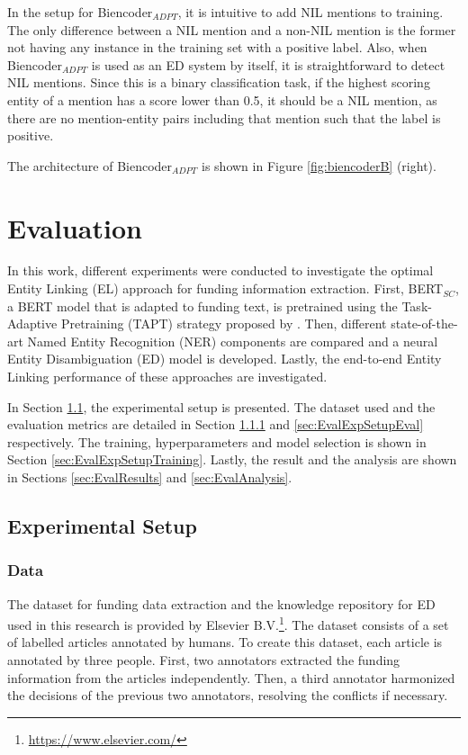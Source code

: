 \documentclass{report}
\theoremstyle{definition}
\theoremstyle{remark}
\begin{document}
In the setup for Biencoder$_{ADPT}$, it is intuitive to add NIL mentions to training. The only difference between a NIL mention and a non-NIL mention is the former not having any instance in the training set with a positive label. Also, when Biencoder$_{ADPT}$ is used as an ED system by itself, it is straightforward to detect NIL mentions. Since this is a binary classification task, if the highest scoring entity of a mention has a score lower than 0.5, it should be a NIL mention, as there are no mention-entity pairs including that mention such that the label is positive. 

The architecture of Biencoder$_{ADPT}$ is shown in Figure \ref{fig:biencoderB} (right).

\newpage
\chapter{Evaluation}
\label{sec:Evaluation}
In this work, different experiments were conducted to investigate the optimal Entity Linking (EL) approach for funding information extraction. First, BERT$_{SC}$, a BERT model that is adapted to funding text, is pretrained using the Task-Adaptive Pretraining (TAPT) strategy proposed by \cite{DontStop}. Then, different state-of-the-art Named Entity Recognition (NER) components are compared and a neural Entity Disambiguation (ED) model is developed. Lastly, the end-to-end Entity Linking performance of these approaches are investigated.

In Section \ref{sec:EvalExpSetup}, the experimental setup is presented. The dataset used and the evaluation metrics are detailed in Section \ref{sec:EvalExpSetupData} and \ref{sec:EvalExpSetupEval} respectively. The training, hyperparameters and model selection is shown in Section \ref{sec:EvalExpSetupTraining}. Lastly, the result and the analysis are shown in Sections \ref{sec:EvalResults} and \ref{sec:EvalAnalysis}.

\section{Experimental Setup}
\label{sec:EvalExpSetup}

\subsection{Data}
\label{sec:EvalExpSetupData}

The dataset for funding data extraction and the knowledge repository for ED used in this research is provided by Elsevier B.V.\footnote{\url{https://www.elsevier.com/}}. The dataset consists of a set of labelled articles annotated by humans. To create this dataset, each article is annotated by three people. First, two annotators extracted the funding information from the articles independently. Then, a third annotator harmonized the decisions of the previous two annotators, resolving the conflicts if necessary. 
\end{document}
